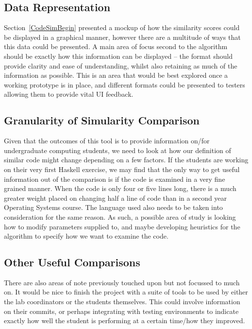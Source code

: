 \subsection{Data Representation}

Section~\ref{CodeSimBegin} presented a mockup of how the similarity scores could
be displayed in a graphical manner, however there are a multitude of ways that
this data could be presented. A main area of focus second to the algorithm should
be exactly how this information can be displayed -- the format should provide
clarity and ease of understanding, whilst also retaining as much of the information
as possible. This is an area that would be best explored once a working prototype
is in place, and different formats could be presented to testers allowing them
to provide vital UI feedback.

\subsection{Granularity of Simularity Comparison}
\label{subsec:SimGranularity}

Given that the outcomes of this tool is to provide information on/for undergraduate
computing students, we need to look at how our definition of similar code might
change depending on a few factors. If the students are working on their very first
Haskell exercise, we may find that the only way to get useful information out
of the comparison is if the code is examined in a very fine grained manner. When
the code is only four or five lines long, there is a much greater weight placed
on changing half a line of code than in a second year Operating Systems course.
The language used also needs to be taken into consideration for the same reason.
As such, a possible area of study is looking how to modify parameters supplied
to, and maybe developing heuristics for the algorithm to specify how we want
to examine the code.

\subsection{Other Useful Comparisons}

There are also areas of note previously touched upon but not focussed to much on.
It would be nice to finish the project with a suite of tools to be used by either
the lab coordinators or the students themselves. This could involve information
on their commits, or perhaps integrating with testing environments to indicate
exactly how well the student is performing at a certain time/how they improved.